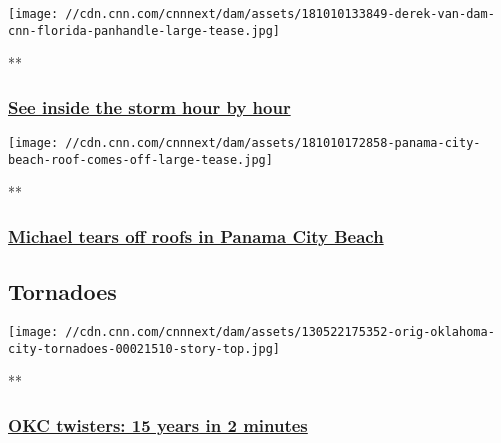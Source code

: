 \href{/videos/weather/2018/10/10/hurricane-michael-hits-florida-panhandle-orig-tc.cnn}{}

\texttt{[image: //cdn.cnn.com/cnnnext/dam/assets/181010133849-derek-van-dam-cnn-florida-panhandle-large-tease.jpg]}

**

\hypertarget{see-inside-the-storm-hour-by-hour}{%
\subsubsection{\texorpdfstring{\href{/videos/weather/2018/10/10/hurricane-michael-hits-florida-panhandle-orig-tc.cnn}{See
inside the storm hour by
hour}}{See inside the storm hour by hour}}\label{see-inside-the-storm-hour-by-hour}}

\href{/videos/weather/2018/10/10/hurricane-michael-panama-city-beach-roofs-ripped-off-orig.cnn}{}

\texttt{[image: //cdn.cnn.com/cnnnext/dam/assets/181010172858-panama-city-beach-roof-comes-off-large-tease.jpg]}

**

\hypertarget{michael-tears-off-roofs-in-panama-city-beach}{%
\subsubsection{\texorpdfstring{\href{/videos/weather/2018/10/10/hurricane-michael-panama-city-beach-roofs-ripped-off-orig.cnn}{Michael
tears off roofs in Panama City
Beach}}{Michael tears off roofs in Panama City Beach}}\label{michael-tears-off-roofs-in-panama-city-beach}}

\hypertarget{tornadoes}{%
\subsection{Tornadoes}\label{tornadoes}}

\href{/videos/weather/2013/05/22/orig-oklahoma-city-tornadoes.cnn}{}

\texttt{[image: //cdn.cnn.com/cnnnext/dam/assets/130522175352-orig-oklahoma-city-tornadoes-00021510-story-top.jpg]}

**

\hypertarget{okc-twisters-15-years-in-2-minutes}{%
\subsubsection{\texorpdfstring{\href{/videos/weather/2013/05/22/orig-oklahoma-city-tornadoes.cnn}{OKC
twisters: 15 years in 2
minutes}}{OKC twisters: 15 years in 2 minutes}}\label{okc-twisters-15-years-in-2-minutes}}

